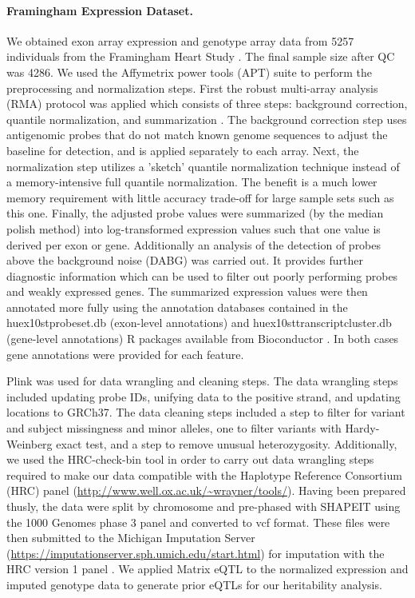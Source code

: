 \documentclass[10pt,letterpaper]{article}
\begin{document}
\paragraph*{Framingham Expression Dataset.}\label{framingham-dataset}

We obtained exon array expression and genotype array data from 5257 individuals from the Framingham Heart Study \cite{Zhang_2015}. The final sample size after QC was 4286. We used the Affymetrix power tools (APT) suite to perform the preprocessing and normalization steps. First the robust multi-array analysis (RMA) protocol was applied which consists of three steps: background correction, quantile normalization, and summarization \cite{irizarry2003summaries}. The background correction step uses antigenomic probes that do not match known genome sequences to adjust the baseline for detection, and is applied separately to each array. Next, the normalization step utilizes a 'sketch' quantile normalization technique instead of a memory-intensive full quantile normalization. The benefit is a much lower memory requirement with little accuracy trade-off for large sample sets such as this one. Finally, the adjusted probe values were summarized (by the median polish method) into log-transformed expression values such that one value is derived per exon or gene. Additionally an analysis of the detection of probes above the background noise (DABG) was carried out. It provides further diagnostic information which can be used to filter out poorly performing probes and weakly expressed genes.  The summarized expression values were then annotated more fully using the annotation databases contained in the huex10stprobeset.db (exon-level annotations) and huex10sttranscriptcluster.db (gene-level annotations) R packages available from Bioconductor \cite{MacDonald_1,MacDonald_2}. In both cases gene annotations were provided for each feature. 

Plink \cite{chang2015second} was used for data wrangling and cleaning steps. The data wrangling steps included updating probe IDs, unifying data to the positive strand, and updating locations to GRCh37. The data cleaning steps included a step to filter for variant and subject missingness and minor alleles, one to filter variants with Hardy-Weinberg exact test, and a step to remove unusual heterozygosity. Additionally, we used the HRC-check-bin tool in order to carry out data wrangling steps required to make our data compatible with the Haplotype Reference Consortium (HRC) panel (\url{http://www.well.ox.ac.uk/~wrayner/tools/}). Having been prepared thusly, the data were split by chromosome and pre-phased with SHAPEIT \cite{delaneau2012linear} using the 1000 Genomes phase 3 panel and converted to vcf format. These files were then submitted to the Michigan Imputation Server (\url{https://imputationserver.sph.umich.edu/start.html}) \cite{Howie_2012,Fuchsberger_2014} for imputation with the HRC version 1 panel \cite{mccarthy2015reference}.  We applied Matrix eQTL \cite{shabalin2012matrix} to the normalized expression and imputed genotype data to generate prior eQTLs for our heritability analysis.
\end{document}
